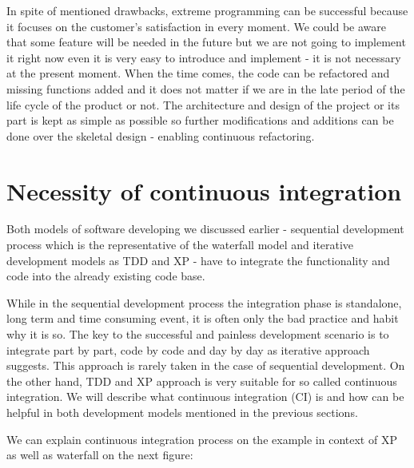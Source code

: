\documentclass[12pt,final,oneside]{fithesis}
\begin{document}
In spite of mentioned drawbacks, extreme programming can be successful because it focuses on the customer's satisfaction in every moment. We could be aware that some feature will be needed in the future but we are not going to implement it right now even it is very easy to introduce and implement - it is not necessary at the present moment. When the time comes, the code can be refactored and missing functions added and it does not matter if we are in the late period of the life cycle of the product or not. The architecture and design of the project or its part is kept as simple as possible so further modifications and additions can be done over the skeletal design - enabling continuous refactoring.

	\section{Necessity of continuous integration}
	
Both models of software developing we discussed earlier - sequential development process which is the representative of the waterfall model and iterative development models as TDD and XP - have to integrate the functionality and code into the already existing code base.

While in the sequential development process the integration phase is standalone, long term and time consuming event, it is often only the bad practice and habit why it is so. The key to the successful and painless development scenario is to integrate part by part, code by code and day by day as iterative approach suggests. This approach is rarely taken in the case of sequential development. On the other hand, TDD and XP approach is very suitable for so called continuous integration. We will describe what continuous integration (CI) is and how can be helpful in both development models mentioned in the previous sections.

We can explain continuous integration process on the example in context of XP as well as waterfall on the next figure:
\end{document}
